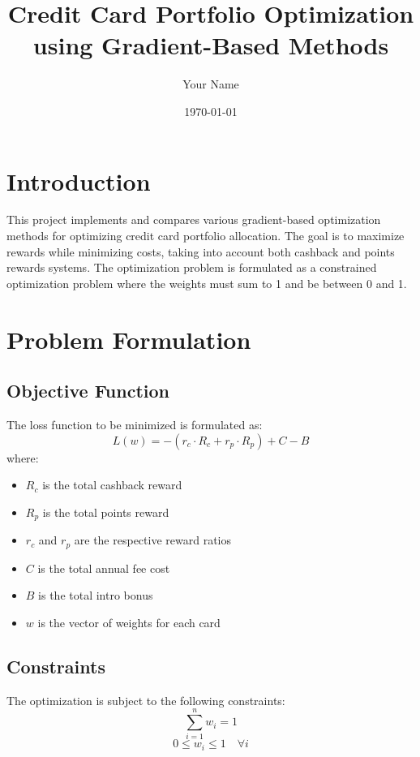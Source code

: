 \documentclass{article}
\title{Credit Card Portfolio Optimization using Gradient-Based Methods}
\author{Your Name}
\date{\today}
\begin{document}
\maketitle

\section{Introduction}
This project implements and compares various gradient-based optimization methods for optimizing credit card portfolio allocation. The goal is to maximize rewards while minimizing costs, taking into account both cashback and points rewards systems. The optimization problem is formulated as a constrained optimization problem where the weights must sum to 1 and be between 0 and 1.

\section{Problem Formulation}
\subsection{Objective Function}
The loss function to be minimized is formulated as:
\begin{equation}
    L(w) = -(r_c \cdot R_c + r_p \cdot R_p) + C - B
\end{equation}
where:
\begin{itemize}
    \item $R_c$ is the total cashback reward
    \item $R_p$ is the total points reward
    \item $r_c$ and $r_p$ are the respective reward ratios
    \item $C$ is the total annual fee cost
    \item $B$ is the total intro bonus
    \item $w$ is the vector of weights for each card
\end{itemize}

\subsection{Constraints}
The optimization is subject to the following constraints:
\begin{equation}
    \sum_{i=1}^{n} w_i = 1
\end{equation}
\begin{equation}
    0 \leq w_i \leq 1 \quad \forall i
\end{equation}
\end{document}
